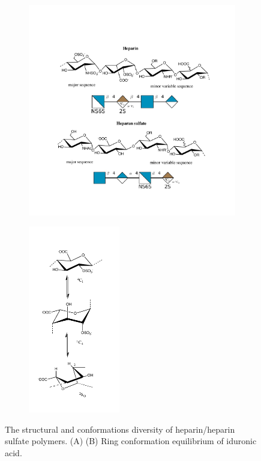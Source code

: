 \documentclass[journal=jctcce,manuscript=article]{achemso}
\begin{document}
{\setlength{\textfloatsep}{0.5cm}
\begin{figure}[!b]
    \begin{subfigure}[b]{0.7\textwidth}
        \includegraphics[width=10cm]{heparin_heparan.pdf}
        \caption{}
        \label{fig:HSHep}
    \end{subfigure}
    \begin{subfigure}[b]{0.28\textwidth}
        \includegraphics[width=4cm]{ido_confs.pdf}
        \caption{}
        \label{fig:IdoConfs}
    \end{subfigure}
    \caption{The structural and conformations diversity of heparin/heparin sulfate polymers. (A)  (B) Ring conformation equilibrium of iduronic acid.}
\end{figure}

}
\end{document}
